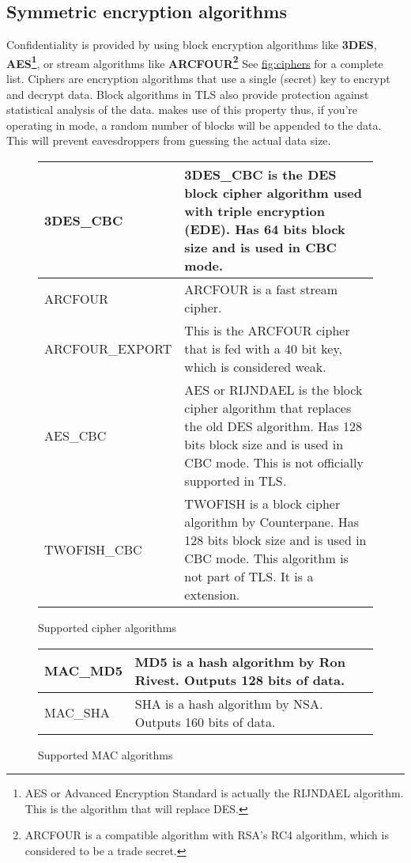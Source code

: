 \subsection{Symmetric encryption algorithms}
\par
Confidentiality is provided by using block encryption algorithms like {\bf 3DES}, 
{\bf AES\footnote{AES or Advanced Encryption Standard is actually the RIJNDAEL algorithm. This is the
algorithm that will replace DES.}}, or
stream algorithms like {\bf ARCFOUR\footnote{ARCFOUR is a compatible
algorithm with RSA's RC4 algorithm, which is considered to be a trade secret.}} See \hyperref{fig:ciphers}{figure }{}{fig:ciphers} for a complete list. 
Ciphers are encryption algorithms that use a single (secret) key
to encrypt and decrypt data. Block algorithms in TLS also provide protection
against statistical analysis of the data. \gnutls{} makes use of this property
thus, if you're operating in \tlsI{} mode, a random number of blocks will be
appended to the data. This will prevent eavesdroppers from guessing the 
actual data size.

\begin{figure}[hbtp]
\begin{tabular}{|l|p{9cm}|}

\hline
3DES\_CBC & 3DES\_CBC is the DES block cipher algorithm used with triple
encryption (EDE). Has 64 bits block size and is used in CBC mode.
\\
\hline
ARCFOUR & ARCFOUR is a fast stream cipher.
\\
\hline
ARCFOUR\_EXPORT & This is the ARCFOUR cipher that is fed with a 40 bit key,
which is considered weak.
\\
\hline
AES\_CBC & AES or RIJNDAEL is the block cipher algorithm that replaces 
the old DES algorithm. Has
128 bits block size and is used in CBC mode. This is not officially
supported in TLS.
\\
\hline
TWOFISH\_CBC & TWOFISH is a block cipher algorithm by Counterpane. Has
128 bits block size and is used in CBC mode. This algorithm is not
part of TLS. It is a \gnutls{} extension.
\\
\hline
\end{tabular}
\caption{Supported cipher algorithms}
\label{fig:ciphers}
\end{figure}



\addvspace{1.5cm}

\begin{figure}[hbtp]
\begin{tabular}{|l|p{9cm}|}

\hline
MAC\_MD5 & MD5 is a hash algorithm by Ron Rivest. Outputs 128 bits of data.
\\
\hline
MAC\_SHA & SHA is a hash algorithm by NSA. Outputs 160 bits of data.
\\
\hline
\end{tabular}
\caption{Supported MAC algorithms}
\label{fig:mac}
\end{figure}

